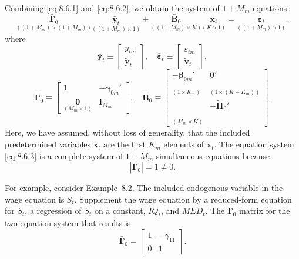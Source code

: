 Combining \eqref{eq:8.6.1} and \eqref{eq:8.6.2}, we obtain the system of $1 + M_m$ equations:
\begin{equation}
  \underset{((1+M_m) \times (1+M_m))}{\bar{\boldsymbol{\Gamma}}_0}
  \underset{((1+M_m) \times 1)}{\bar{\mathbf{y}}_t}
  + \underset{((1+M_m) \times K)}{\bar{\mathbf{B}}_0}
  \underset{(K \times 1)}{\mathbf{x}_t}
  = \underset{((1+M_m) \times 1)}{\bar{\boldsymbol{\varepsilon}}_t},
  \label{eq:8.6.3} \tag{8.6.3}
\end{equation}
where
\[
  \bar{\mathbf{y}}_t \equiv \begin{bmatrix} y_{tm} \\ \tilde{\mathbf{y}}_t \end{bmatrix}, \quad
  \bar{\boldsymbol{\varepsilon}}_t \equiv \begin{bmatrix} \varepsilon_{tm} \\ \tilde{\mathbf{v}}_t \end{bmatrix},
\]
\begin{equation}
  \bar{\boldsymbol{\Gamma}}_0
  \equiv \begin{bmatrix}
    1 & -\boldsymbol{\gamma}_{0m}' \\
    \underset{(M_m \times 1)}{\mathbf{0}} & \mathbf{I}_{M_m}
  \end{bmatrix}, \quad
  \bar{\mathbf{B}}_0
  \equiv \begin{bmatrix}
    -\boldsymbol{\beta}_{0m}' & \mathbf{0}' \\
    \underset{(1 \times K_m)}{\phantom{x}} & \underset{(1 \times (K - K_m))}{\phantom{x}} \\
    & -\tilde{\boldsymbol{\Pi}}_0' \\
    \underset{(M_m \times K)}{\phantom{x}}
  \end{bmatrix}.
  \label{eq:8.6.4} \tag{8.6.4}
\end{equation}
Here, we have assumed, without loss of generality, that the included predetermined
variables $\tilde{\mathbf{x}}_t$ are the first $K_m$ elements of $\mathbf{x}_t$. The equation system \eqref{eq:8.6.3} is a complete system of $1 + M_m$ simultaneous equations because
\begin{equation}
  |\bar{\boldsymbol{\Gamma}}_0| = 1 \neq 0.
  \label{eq:8.6.5} \tag{8.6.5}
\end{equation}

For example, consider Example~8.2. The included endogenous variable in the
wage equation is $S_t$. Supplement the wage equation by a reduced-form equation
for $S_t$, a regression of $S_t$ on a constant, $IQ_t$, and $MED_t$. The $\bar{\boldsymbol{\Gamma}}_0$ matrix for the
two-equation system that results is
\[
  \bar{\boldsymbol{\Gamma}}_0
  = \begin{bmatrix} 1 & -\gamma_{11} \\ 0 & 1 \end{bmatrix}.
\]

